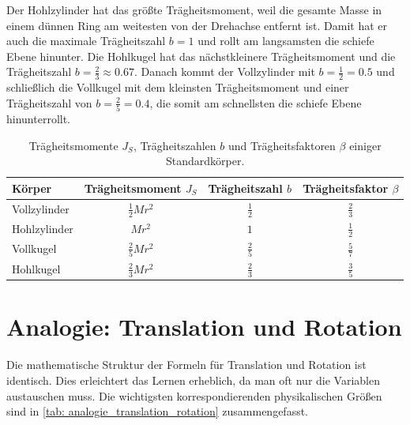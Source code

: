 Der Hohlzylinder hat das größte Trägheitsmoment, weil die gesamte Masse in einem dünnen Ring am weitesten von der Drehachse entfernt ist. Damit hat er auch die maximale Trägheitszahl $b=1$ und rollt am langsamsten die schiefe Ebene hinunter. Die Hohlkugel hat das nächstkleinere Trägheitsmoment und die Trägheitszahl $b=\frac{2}{3} \approx 0.67$. Danach kommt der Vollzylinder mit  $b=\frac{1}{2}= 0.5$ und schließlich die Vollkugel mit dem kleinsten Trägheitsmoment und einer Trägheitszahl von $b=\frac{2}{5}= 0.4$, die somit am schnellsten die schiefe Ebene hinunterrollt.
\begin{table}[htb]
    \centering
    \renewcommand{\arraystretch}{1.3}
    \begin{tabularx}{0.9\textwidth}{Xc|c|c}
        \toprule
        \textbf{Körper} & \textbf{Trägheitsmoment $J_S$} & \textbf{Trägheitszahl $b$} & \textbf{Trägheitsfaktor $\beta$} \\
        \midrule
        Vollzylinder & $\frac{1}{2} M r^2$ & $\frac{1}{2}$ & $\frac{2}{3}$ \\
        Hohlzylinder & $M r^2$ & $1$ & $\frac{1}{2}$ \\
        Vollkugel & $\frac{2}{5} M r^2$ & $\frac{2}{5}$ & $\frac{5}{7}$ \\
        Hohlkugel & $\frac{2}{3} M r^2$ & $\frac{2}{3}$ & $\frac{3}{5}$ \\
        \bottomrule
    \end{tabularx}
    \caption{Trägheitsmomente $J_S$, Trägheitszahlen $b$ und Trägheitsfaktoren $\beta$ einiger Standardkörper.}\label{tab: traegheitsfaktor_standardkoerper}
\end{table} 


\section{Analogie: Translation und Rotation}\label{sec: analogie_trans_rot}
Die mathematische Struktur der Formeln für Translation und Rotation ist identisch. Dies erleichtert das Lernen erheblich, da man oft nur die Variablen austauschen muss. Die wichtigsten korrespondierenden physikalischen Größen sind in \cref{tab: analogie_translation_rotation} zusammengefasst.

